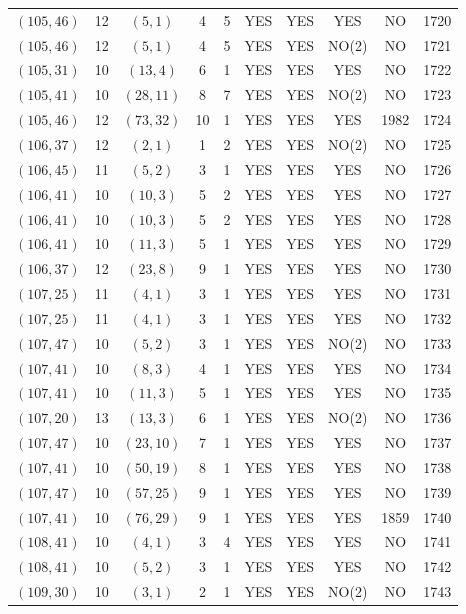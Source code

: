 \begin{longtable}{|c|c|c|c|c|c|c|c|c|c|}
$(105, 46)$ & 12 & $(5, 1)$ & 4 & 5 & YES & YES & YES & NO & 1720\\
$(105, 46)$ & 12 & $(5, 1)$ & 4 & 5 & YES & YES & NO(2) & NO & 1721\\
$(105, 31)$ & 10 & $(13, 4)$ & 6 & 1 & YES & YES & YES & NO & 1722\\
$(105, 41)$ & 10 & $(28, 11)$ & 8 & 7 & YES & YES & NO(2) & NO & 1723\\
$(105, 46)$ & 12 & $(73, 32)$ & 10 & 1 & YES & YES & YES & 1982 & 1724\\
$(106, 37)$ & 12 & $(2, 1)$ & 1 & 2 & YES & YES & NO(2) & NO & 1725\\
$(106, 45)$ & 11 & $(5, 2)$ & 3 & 1 & YES & YES & YES & NO & 1726\\
$(106, 41)$ & 10 & $(10, 3)$ & 5 & 2 & YES & YES & YES & NO & 1727\\
$(106, 41)$ & 10 & $(10, 3)$ & 5 & 2 & YES & YES & YES & NO & 1728\\
$(106, 41)$ & 10 & $(11, 3)$ & 5 & 1 & YES & YES & YES & NO & 1729\\
$(106, 37)$ & 12 & $(23, 8)$ & 9 & 1 & YES & YES & YES & NO & 1730\\
$(107, 25)$ & 11 & $(4, 1)$ & 3 & 1 & YES & YES & YES & NO & 1731\\
$(107, 25)$ & 11 & $(4, 1)$ & 3 & 1 & YES & YES & YES & NO & 1732\\
$(107, 47)$ & 10 & $(5, 2)$ & 3 & 1 & YES & YES & NO(2) & NO & 1733\\
$(107, 41)$ & 10 & $(8, 3)$ & 4 & 1 & YES & YES & YES & NO & 1734\\
$(107, 41)$ & 10 & $(11, 3)$ & 5 & 1 & YES & YES & YES & NO & 1735\\
$(107, 20)$ & 13 & $(13, 3)$ & 6 & 1 & YES & YES & NO(2) & NO & 1736\\
$(107, 47)$ & 10 & $(23, 10)$ & 7 & 1 & YES & YES & YES & NO & 1737\\
$(107, 41)$ & 10 & $(50, 19)$ & 8 & 1 & YES & YES & YES & NO & 1738\\
$(107, 47)$ & 10 & $(57, 25)$ & 9 & 1 & YES & YES & YES & NO & 1739\\
$(107, 41)$ & 10 & $(76, 29)$ & 9 & 1 & YES & YES & YES & 1859 & 1740\\
$(108, 41)$ & 10 & $(4, 1)$ & 3 & 4 & YES & YES & YES & NO & 1741\\
$(108, 41)$ & 10 & $(5, 2)$ & 3 & 1 & YES & YES & YES & NO & 1742\\
$(109, 30)$ & 10 & $(3, 1)$ & 2 & 1 & YES & YES & NO(2) & NO & 1743\\

\end{longtable}
